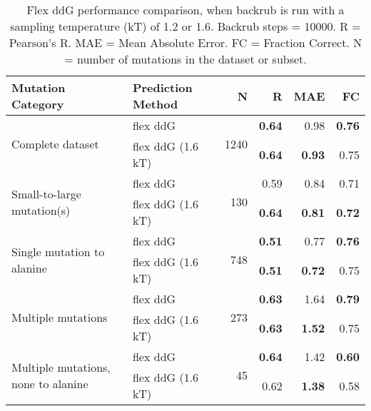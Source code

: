 \begin{table}
  \begin{tabular}{llrrrr}
\toprule
Mutation Category &  Prediction Method &     N &    R &  MAE &   FC \\
\midrule
 \multirow{ 2}{*}{Complete dataset} & flex ddG & \multirow{ 2}{*}{1240} & \textbf{0.64} & 0.98 & \textbf{0.76}  \\
 & flex ddG (1.6 kT) & & \textbf{0.64} & \textbf{0.93} & 0.75  \\
\hline
 \multirow{ 2}{*}{Small-to-large mutation(s)} & flex ddG & \multirow{ 2}{*}{130} & 0.59 & 0.84 & 0.71  \\
 & flex ddG (1.6 kT) & & \textbf{0.64} & \textbf{0.81} & \textbf{0.72}  \\
\hline
 \multirow{ 2}{*}{Single mutation to alanine} & flex ddG & \multirow{ 2}{*}{748} & \textbf{0.51} & 0.77 & \textbf{0.76}  \\
 & flex ddG (1.6 kT) & & \textbf{0.51} & \textbf{0.72} & 0.75  \\
\hline
 \multirow{ 2}{*}{Multiple mutations} & flex ddG & \multirow{ 2}{*}{273} & \textbf{0.63} & 1.64 & \textbf{0.79}  \\
 & flex ddG (1.6 kT) & & \textbf{0.63} & \textbf{1.52} & 0.75  \\
\hline
 \multirow{ 2}{*}{Multiple mutations, none to alanine} & flex ddG & \multirow{ 2}{*}{45} & \textbf{0.64} & 1.42 & \textbf{0.60}  \\
 & flex ddG (1.6 kT) & & 0.62 & \textbf{1.38} & 0.58  \\
\bottomrule
\end{tabular}
  \caption[Comparison of backrub temperature results]{
    Flex ddG performance comparison, when backrub is run with a sampling temperature (kT) of 1.2 or 1.6. Backrub steps = 10000. R = Pearson's R. MAE = Mean Absolute Error. FC = Fraction Correct. N = number of mutations in the dataset or subset.
  } \label{tab:table-temperature}
\end{table}
